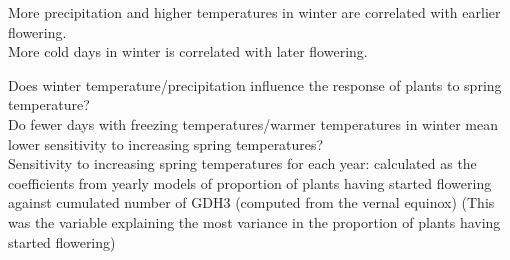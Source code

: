 \documentclass[10pt,]{article}
\begin{document}
More precipitation and higher temperatures in winter are correlated with
earlier flowering.\\
More cold days in winter is correlated with later flowering.

Does winter temperature/precipitation influence the response of plants
to spring temperature?\\
Do fewer days with freezing temperatures/warmer temperatures in winter
mean lower sensitivity to increasing spring temperatures?\\
Sensitivity to increasing spring temperatures for each year: calculated
as the coefficients from yearly models of proportion of plants having
started flowering against cumulated number of GDH3 (computed from the
vernal equinox) (This was the variable explaining the most variance in
the proportion of plants having started flowering)
\end{document}
